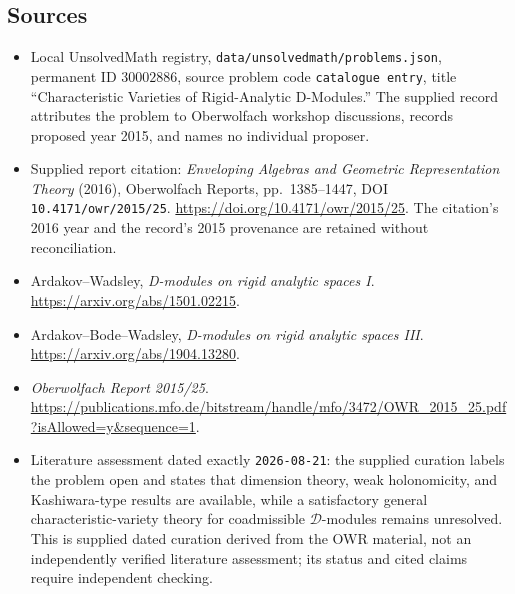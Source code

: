 \documentclass[11pt]{article}
\begin{document}
\subsection{Sources}
\begin{itemize}
\item Local UnsolvedMath registry, \texttt{data/unsolvedmath/problems.json}, permanent ID \(30002886\), source problem code \texttt{catalogue entry}, title ``Characteristic Varieties of Rigid-Analytic D-Modules.'' The supplied record attributes the problem to Oberwolfach workshop discussions, records proposed year 2015, and names no individual proposer.
\item Supplied report citation: \emph{Enveloping Algebras and Geometric Representation Theory} (2016), Oberwolfach Reports, pp.~1385--1447, DOI \texttt{10.4171/owr/2015/25}. \url{https://doi.org/10.4171/owr/2015/25}. The citation's 2016 year and the record's 2015 provenance are retained without reconciliation.
\item Ardakov--Wadsley, \emph{D-modules on rigid analytic spaces I}. \url{https://arxiv.org/abs/1501.02215}.
\item Ardakov--Bode--Wadsley, \emph{D-modules on rigid analytic spaces III}. \url{https://arxiv.org/abs/1904.13280}.
\item \emph{Oberwolfach Report 2015/25}. \url{https://publications.mfo.de/bitstream/handle/mfo/3472/OWR_2015_25.pdf?isAllowed=y&sequence=1}.
\item Literature assessment dated exactly \texttt{2026-08-21}: the supplied curation labels the problem open and states that dimension theory, weak holonomicity, and Kashiwara-type results are available, while a satisfactory general characteristic-variety theory for coadmissible \(\mathcal D\)-modules remains unresolved. This is supplied dated curation derived from the OWR material, not an independently verified literature assessment; its status and cited claims require independent checking.
\end{itemize}
\end{document}
